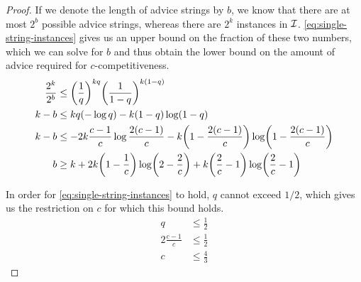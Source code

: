 \begin{proof}
    If we denote the length of advice strings by $b$, we know that there
    are at most $2^b$ possible advice strings, whereas there are $2^k$
    instances in $\mathcal{I}$. \eqref{eq:single-string-instances} gives us an
    upper bound on the fraction of these two numbers, which we can solve
    for $b$ and thus obtain the lower bound on the amount of advice
    required for $c$-competitiveness.
    \begin{align*}
        \frac{2^k}{2^b} &\leq \paren*{\frac{1}{q}}^{kq}
            \paren*{\frac{1}{1-q}}^{k(1-q)} \\
        k-b &\leq kq(-\log{}q) - k(1-q)\log(1-q) \\
        k-b &\leq -2k\frac{c-1}{c}\log\frac{2(c-1)}{c} -
            k\paren*{1-\frac{2(c-1)}{c}} \log\paren*{1-\frac{2(c-1)}{c}} \\
        b &\geq k + 2k\paren*{1-\frac{1}{c}}\log\paren*{2-\frac{2}{c}}
            + k\paren*{\frac{2}{c}-1}\log\paren*{\frac{2}{c}-1}
    \end{align*}

    In order for \eqref{eq:single-string-instances} to hold, $q$ cannot
    exceed $1/2$, which gives us the restriction on $c$ for which this
    bound holds.
    \begin{align*}
        q &\leq \frac{1}{2} \\
        2\frac{c-1}{c} &\leq \frac{1}{2} \\
        c &\leq \frac{4}{3}
    \end{align*}
\end{proof}
